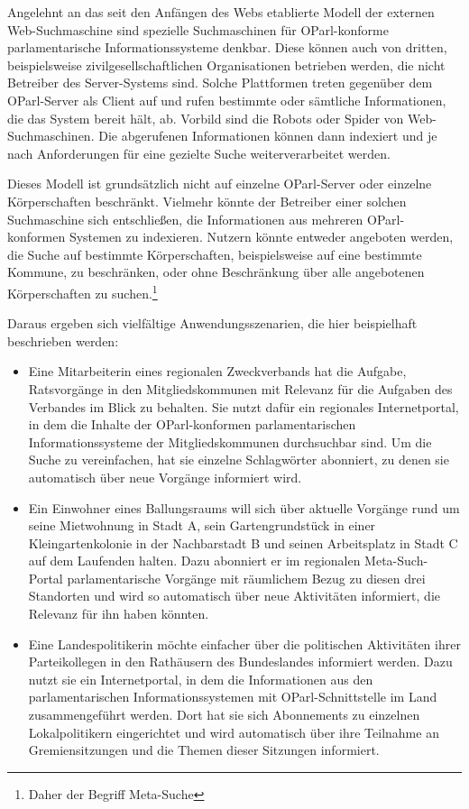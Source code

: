 \documentclass[,a4paper]{article}
\begin{document}
Angelehnt an das seit den Anfängen des Webs etablierte Modell der
externen Web-Suchmaschine sind spezielle Suchmaschinen für
OParl-konforme parlamentarische Informationssysteme denkbar. Diese
können auch von dritten, beispielsweise zivilgesellschaftlichen
Organisationen betrieben werden, die nicht Betreiber des Server-Systems
sind. Solche Plattformen treten gegenüber dem OParl-Server als Client
auf und rufen bestimmte oder sämtliche Informationen, die das System
bereit hält, ab. Vorbild sind die Robots oder Spider von
Web-Suchmaschinen. Die abgerufenen Informationen können dann indexiert
und je nach Anforderungen für eine gezielte Suche weiterverarbeitet
werden.

Dieses Modell ist grundsätzlich nicht auf einzelne OParl-Server oder
einzelne Körperschaften beschränkt. Vielmehr könnte der Betreiber einer
solchen Suchmaschine sich entschließen, die Informationen aus mehreren
OParl-konformen Systemen zu indexieren. Nutzern könnte entweder
angeboten werden, die Suche auf bestimmte Körperschaften, beispielsweise
auf eine bestimmte Kommune, zu beschränken, oder ohne Beschränkung über
alle angebotenen Körperschaften zu suchen.\footnote{Daher der Begriff
  Meta-Suche}

Daraus ergeben sich vielfältige Anwendungsszenarien, die hier
beispielhaft beschrieben werden:

\begin{itemize}
\item
  Eine Mitarbeiterin eines regionalen Zweckverbands hat die Aufgabe,
  Ratsvorgänge in den Mitgliedskommunen mit Relevanz für die Aufgaben
  des Verbandes im Blick zu behalten. Sie nutzt dafür ein regionales
  Internetportal, in dem die Inhalte der OParl-konformen
  parlamentarischen Informationssysteme der Mitgliedskommunen
  durchsuchbar sind. Um die Suche zu vereinfachen, hat sie einzelne
  Schlagwörter abonniert, zu denen sie automatisch über neue Vorgänge
  informiert wird.
\item
  Ein Einwohner eines Ballungsraums will sich über aktuelle Vorgänge
  rund um seine Mietwohnung in Stadt A, sein Gartengrundstück in einer
  Kleingartenkolonie in der Nachbarstadt B und seinen Arbeitsplatz in
  Stadt C auf dem Laufenden halten. Dazu abonniert er im regionalen
  Meta-Such-Portal parlamentarische Vorgänge mit räumlichem Bezug zu
  diesen drei Standorten und wird so automatisch über neue Aktivitäten
  informiert, die Relevanz für ihn haben könnten.
\item
  Eine Landespolitikerin möchte einfacher über die politischen
  Aktivitäten ihrer Parteikollegen in den Rathäusern des Bundeslandes
  informiert werden. Dazu nutzt sie ein Internetportal, in dem die
  Informationen aus den parlamentarischen Informationssystemen mit
  OParl-Schnittstelle im Land zusammengeführt werden. Dort hat sie sich
  Abonnements zu einzelnen Lokalpolitikern eingerichtet und wird
  automatisch über ihre Teilnahme an Gremiensitzungen und die Themen
  dieser Sitzungen informiert.
\end{itemize}
\end{document}
